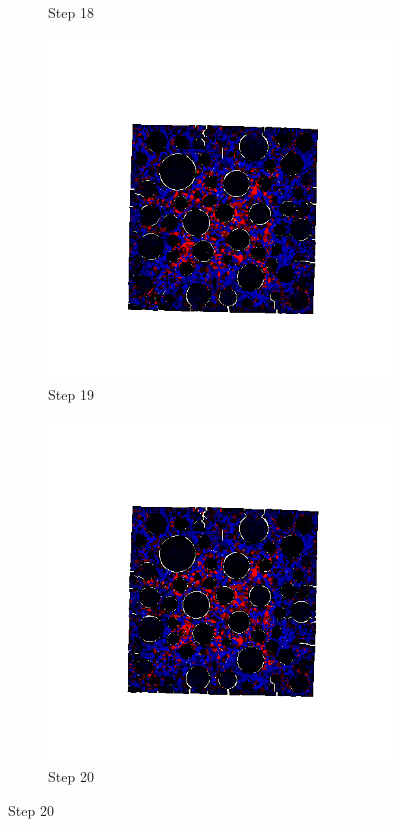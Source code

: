 \begin{figure}[ht!]
\begin{subfigure}{.25\textwidth}
      \caption{Step 18}
      \end{subfigure}%
      \begin{subfigure}{.25\textwidth}
        \centering
        \includegraphics[width=1.0\linewidth]{Files/A30X0C_3_IS/DEP50-STEP(019).png}
      \caption{Step 19}
      \end{subfigure}%
      \begin{subfigure}{.25\textwidth}
        \centering
        \includegraphics[width=1.0\linewidth]{Files/A30X0C_3_IS/DEP50-STEP(020).png}
      \caption{Step 20}
      \end{subfigure}


\end{figure}
